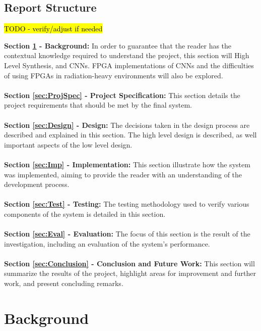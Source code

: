 \documentclass[12pt]{article}
\begin{document}
\subsection{Report Structure}
\label{sec:Intro-Structure}

\hl{TODO - verify/adjust if needed}

\textbf{Section \ref{sec:Background} - Background:} In order to guarantee that the reader has the contextual knowledge required to understand the project, this section will High Level Synthesis, and CNNs. FPGA implementations of CNNs and the difficulties of using FPGAs in radiation-heavy environments will also be explored.\\
\\
\textbf{Section \ref{sec:ProjSpec} - Project Specification:} This section details the project requirements that should be met by the final system.\\
\\
\textbf{Section \ref{sec:Design} - Design:} The decisions taken in the design process are described and explained in this section. The high level design is described, as well important aspects of the low level design.\\
\\
\textbf{Section \ref{sec:Imp} - Implementation:} This section illustrate how the system was implemented, aiming to provide the reader with an understanding of the development process.\\
\\
\textbf{Section \ref{sec:Test} - Testing:} The testing methodology used to verify various components of the system is detailed in this section.\\
\\
\textbf{Section \ref{sec:Eval} - Evaluation:} The focus of this section is the result of the investigation, including an evaluation of the system's performance.\\
\\
\textbf{Section \ref{sec:Conclusion} - Conclusion and Future Work:} This section will summarize the results of the project, highlight areas for improvement and further work, and present concluding remarks.\\

\newpage

\section{Background}
\label{sec:Background}
\end{document}
